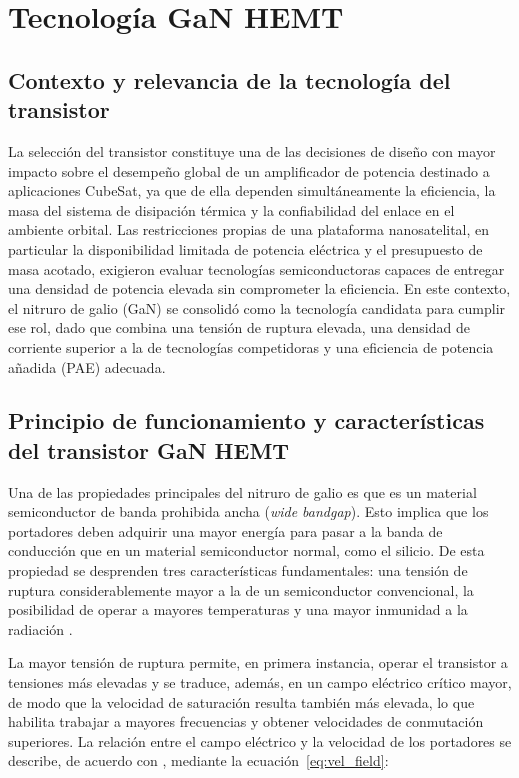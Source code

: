 \newpage
\section{Tecnología GaN HEMT} \label{sec:gan_hemt}
\subsection{Contexto y relevancia de la tecnología del transistor}
La selección del transistor constituye una de las decisiones de diseño con mayor impacto sobre el desempeño global de un amplificador de potencia destinado a aplicaciones CubeSat, ya que de ella dependen simultáneamente la eficiencia, la masa del sistema de disipación térmica y la confiabilidad del enlace en el ambiente orbital. Las restricciones propias de una plataforma nanosatelital, en particular la disponibilidad limitada de potencia eléctrica y el presupuesto de masa acotado, exigieron evaluar tecnologías semiconductoras capaces de entregar una densidad de potencia elevada sin comprometer la eficiencia. En este contexto, el nitruro de galio (GaN) se consolidó como la tecnología candidata para cumplir ese rol, dado que combina una tensión de ruptura elevada, una densidad de corriente superior a la de tecnologías competidoras y una eficiencia de potencia añadida (PAE) adecuada.

\subsection{Principio de funcionamiento y características del transistor GaN HEMT}
Una de las propiedades principales del nitruro de galio es que es un material semiconductor de banda prohibida ancha (\textit{wide bandgap}). Esto implica que los portadores deben adquirir una mayor energía para pasar a la banda de conducción que en un material semiconductor normal, como el silicio. De esta propiedad se desprenden tres características fundamentales: una tensión de ruptura considerablemente mayor a la de un semiconductor convencional, la posibilidad de operar a mayores temperaturas y una mayor inmunidad a la radiación \cite{Mishra2008, Deblecker2015}.

La mayor tensión de ruptura permite, en primera instancia, operar el transistor a tensiones más elevadas y se traduce, además, en un campo eléctrico crítico mayor, de modo que la velocidad de saturación resulta también más elevada, lo que habilita trabajar a mayores frecuencias y obtener velocidades de conmutación superiores. La relación entre el campo eléctrico y la velocidad de los portadores se describe, de acuerdo con \cite{Taur_Ning_2021}, mediante la ecuación~\eqref{eq:vel_field}:

